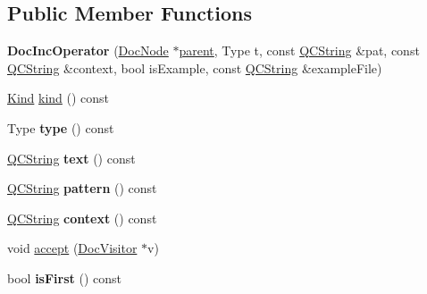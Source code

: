 \subsection*{Public Member Functions}
\begin{DoxyCompactItemize}
\item 
\mbox{\label{class_doc_inc_operator_a6211ce627975ce96c72df771d1b47828}} 
{\bfseries Doc\+Inc\+Operator} (\mbox{\hyperlink{class_doc_node}{Doc\+Node}} $\ast$\mbox{\hyperlink{class_doc_node_a73e8ad29a91cfceb0968eb00db71a23d}{parent}}, Type t, const \mbox{\hyperlink{class_q_c_string}{Q\+C\+String}} \&pat, const \mbox{\hyperlink{class_q_c_string}{Q\+C\+String}} \&context, bool is\+Example, const \mbox{\hyperlink{class_q_c_string}{Q\+C\+String}} \&example\+File)
\item 
\mbox{\hyperlink{class_doc_node_aebd16e89ca590d84cbd40543ea5faadb}{Kind}} \mbox{\hyperlink{class_doc_inc_operator_a3534f7134847af9d29b60cbf308d0955}{kind}} () const
\item 
\mbox{\label{class_doc_inc_operator_ad22086824c941ff3099faa8c45f3a02a}} 
Type {\bfseries type} () const
\item 
\mbox{\label{class_doc_inc_operator_a91b44df290fd25ebcc9125227b593ece}} 
\mbox{\hyperlink{class_q_c_string}{Q\+C\+String}} {\bfseries text} () const
\item 
\mbox{\label{class_doc_inc_operator_ade13cdced8ba724a6c9cbadb813da27f}} 
\mbox{\hyperlink{class_q_c_string}{Q\+C\+String}} {\bfseries pattern} () const
\item 
\mbox{\label{class_doc_inc_operator_ab59377a5d6002c488ebfaeff4c8f2e64}} 
\mbox{\hyperlink{class_q_c_string}{Q\+C\+String}} {\bfseries context} () const
\item 
void \mbox{\hyperlink{class_doc_inc_operator_a04e255a29d4ab90b17f2ebc233fe288a}{accept}} (\mbox{\hyperlink{class_doc_visitor}{Doc\+Visitor}} $\ast$v)
\item 
\mbox{\label{class_doc_inc_operator_ad5fc63c8a8ab2ebb0359443aba890802}} 
bool {\bfseries is\+First} () const
\item 
\mbox{\label{class_doc_inc_operator_a3aa61fa6f30b556886cf8460ed9e0a3c}} 

\end{DoxyCompactItemize}

